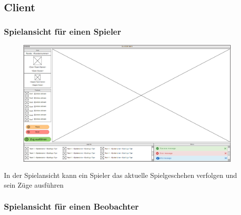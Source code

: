 \subsection{Client}

    \subsubsection{Spielansicht für einen Spieler}

    \begin{figure}[H]
        \centering
        \includegraphics[width=\textwidth]{images/InGameDesigenPlayer.PNG}
    \end{figure}

    In der Spielansicht kann ein Spieler das aktuelle Spielgeschehen verfolgen und sein Züge ausführen

    \subsubsection{Spielansicht für einen Beobachter}
    
    
        \centering

